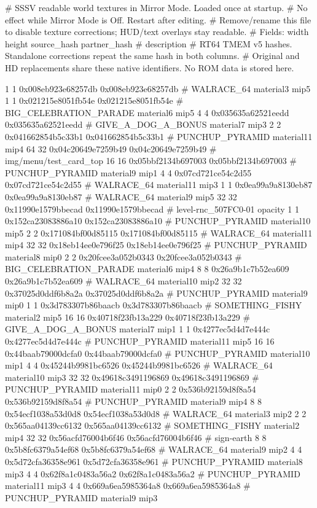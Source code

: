 # SSSV readable world textures in Mirror Mode. Loaded once at startup.
# No effect while Mirror Mode is Off. Restart after editing.
# Remove/rename this file to disable texture corrections; HUD/text overlays stay readable.
# Fields: width height source_hash partner_hash # description
# RT64 TMEM v5 hashes. Standalone corrections repeat the same hash in both columns.
# Original and HD replacements share these native identifiers. No ROM data is stored here.

1 1 0x008eb923e68257db 0x008eb923e68257db # WALRACE_64 material3 mip5
1 1 0x021215e8051fb54e 0x021215e8051fb54e # BIG_CELEBRATION_PARADE material6 mip5
4 4 0x035635a62521eedd 0x035635a62521eedd # GIVE_A_DOG_A_BONUS material7 mip3
2 2 0x041662854b5c33b1 0x041662854b5c33b1 # PUNCHUP_PYRAMID material11 mip4
64 32 0x04c20649e7259b49 0x04c20649e7259b49 # img/menu/test_card_top
16 16 0x05bbf2134b697003 0x05bbf2134b697003 # PUNCHUP_PYRAMID material9 mip1
4 4 0x07cd721ce54c2d55 0x07cd721ce54c2d55 # WALRACE_64 material11 mip3
1 1 0x0ea99a9a8130eb87 0x0ea99a9a8130eb87 # WALRACE_64 material9 mip5
32 32 0x11990e1579bbecad 0x11990e1579bbecad # level-rnc_507FC0-01 opacity
1 1 0x152ca23083886a10 0x152ca23083886a10 # PUNCHUP_PYRAMID material10 mip5
2 2 0x171084bf00d85115 0x171084bf00d85115 # WALRACE_64 material11 mip4
32 32 0x18eb14ee0e796f25 0x18eb14ee0e796f25 # PUNCHUP_PYRAMID material8 mip0
2 2 0x20fcee3a052b0343 0x20fcee3a052b0343 # BIG_CELEBRATION_PARADE material6 mip4
8 8 0x26a9b1c7b52ea609 0x26a9b1c7b52ea609 # WALRACE_64 material10 mip2
32 32 0x37025d0ddf6b8a2a 0x37025d0ddf6b8a2a # PUNCHUP_PYRAMID material9 mip0
1 1 0x3d783307b86baacb 0x3d783307b86baacb # SOMETHING_FISHY material2 mip5
16 16 0x40718f23fb13a229 0x40718f23fb13a229 # GIVE_A_DOG_A_BONUS material7 mip1
1 1 0x4277ec5d4d7e444c 0x4277ec5d4d7e444c # PUNCHUP_PYRAMID material11 mip5
16 16 0x44baab79000dcfa0 0x44baab79000dcfa0 # PUNCHUP_PYRAMID material10 mip1
4 4 0x45244b9981bc6526 0x45244b9981bc6526 # WALRACE_64 material10 mip3
32 32 0x49618c3491196869 0x49618c3491196869 # PUNCHUP_PYRAMID material11 mip0
2 2 0x536b92159d8f8a54 0x536b92159d8f8a54 # PUNCHUP_PYRAMID material9 mip4
8 8 0x54ecf1038a53d0d8 0x54ecf1038a53d0d8 # WALRACE_64 material3 mip2
2 2 0x565aa04139cc6132 0x565aa04139cc6132 # SOMETHING_FISHY material2 mip4
32 32 0x56acfd76004b6f46 0x56acfd76004b6f46 # sign-earth
8 8 0x5b8fc6379a54ef68 0x5b8fc6379a54ef68 # WALRACE_64 material9 mip2
4 4 0x5d72cfa36358e961 0x5d72cfa36358e961 # PUNCHUP_PYRAMID material8 mip3
4 4 0x62f8a1c0483a56a2 0x62f8a1c0483a56a2 # PUNCHUP_PYRAMID material11 mip3
4 4 0x669a6ea5985364a8 0x669a6ea5985364a8 # PUNCHUP_PYRAMID material9 mip3
